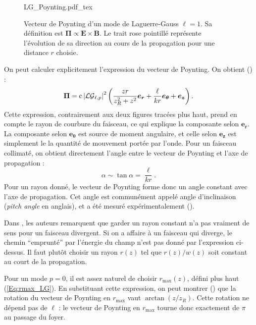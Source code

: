 \begin{figure}[!ht]
\centering
\def\svgwidth{0.7\columnwidth}
{LG_Poynting.pdf_tex}
\caption{Vecteur de Poynting d'un mode de Laguerre-Gauss $\ell=1$. Sa définition est $\bm{\Pi} \propto \bm{E}\times\bm{B}$. Le trait rose pointillé représente l'évolution de sa direction au cours de la propagation pour une distance $r$ choisie.}
\label{Fig:LGPoynting}
\end{figure}

On peut calculer explicitement l'expression du vecteur de Poynting. On obtient () :
\begin{equation*}
\bm{\Pi} = \mathrm{c}\left|\mathcal{LG}_{\ell,p}\right|^2\left(\frac{zr}{z_R^2+z^2}\bm{e_r}+\frac{\ell}{kr}\bm{e_\theta}+\bm{e_z}\right).
\end{equation*}
Cette expression, contrairement aux deux figures tracées plus haut, prend en compte le rayon de courbure du faisceau, ce qui explique la composante selon $\bm{e_r}$. La composante selon $\bm{e_\theta}$ est source de moment angulaire, et celle selon $\bm{e_z}$ est simplement le la quantité de mouvement portée par l'onde. Pour un faisceau collimaté, on obtient directement l'angle entre le vecteur de Poynting et l'axe de propagation :
\begin{equation*}
\alpha \sim \tan{\alpha} = \frac{\ell}{kr}.
\end{equation*}
Pour un rayon donné, le vecteur de Poynting forme donc un angle constant avec l'axe de propagation. Cet angle est communément appelé angle d'inclinaison (\textit{pitch angle} en anglais), et a été mesuré expérimentalement ().\par
Dans , les auteurs remarquent que garder un rayon constant n'a pas vraiment de sens pour un faisceau divergent. Si on a affaire à un faisceau qui diverge, le chemin ``emprunté'' par l'énergie du champ n'est pas donné par l'expression ci-dessus. Il faut plutôt choisir un rayon $r(z)$ tel que $r(z)/w(z)$ soit constant au court de la propagation.\par
Pour un mode $p=0$, il est assez naturel de choisir $r_\mathrm{max}(z)$, défini plus haut (\ref{Eq:rmax_LG}). En substituant cette expression, on peut montrer () que la rotation du vecteur de Poynting en $r_\mathrm{max}$ vaut $\arctan{(z/z_R)}$. Cette rotation ne dépend pas de $\ell$ : le vecteur de Poynting en $r_\mathrm{max}$ tourne donc exactement de $\pi$ au passage du foyer. 

